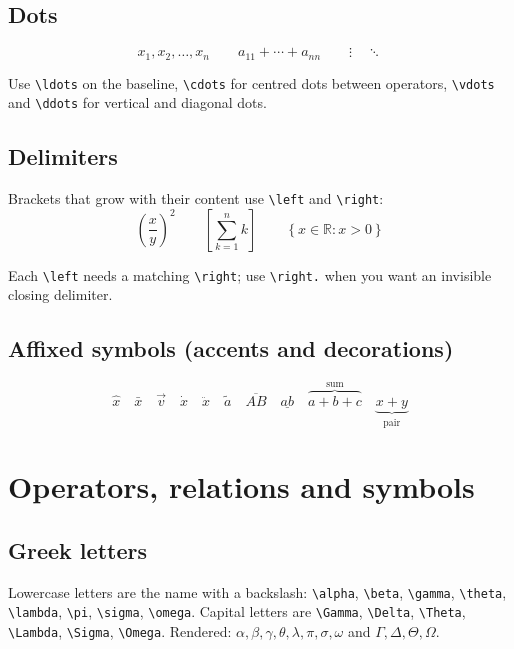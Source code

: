 \documentclass[11pt,a4paper]{article}
\begin{document}
\subsection{Dots}

\[
  x_1, x_2, \ldots, x_n \qquad
  a_{11} + \cdots + a_{nn} \qquad
  \vdots \quad \ddots
\]

Use \verb|\ldots| on the baseline, \verb|\cdots| for centred dots
between operators, \verb|\vdots| and \verb|\ddots| for vertical and
diagonal dots.

\subsection{Delimiters}

Brackets that grow with their content use \verb|\left| and \verb|\right|:
\[
  \left( \frac{x}{y} \right)^{2} \qquad
  \left[ \sum_{k=1}^{n} k \right] \qquad
  \left\{ x \in \mathbb{R} : x > 0 \right\}
\]

Each \verb|\left| needs a matching \verb|\right|; use \verb|\right.|
when you want an invisible closing delimiter.

\subsection{Affixed symbols (accents and decorations)}

\[
  \hat{x} \quad \bar{x} \quad \vec{v} \quad \dot{x} \quad \ddot{x}
  \quad \tilde{a} \quad \overline{AB} \quad \underline{ab}
  \quad \overbrace{a+b+c}^{\text{sum}} \quad \underbrace{x+y}_{\text{pair}}
\]

\section{Operators, relations and symbols}

\subsection{Greek letters}

Lowercase letters are the name with a backslash: \verb|\alpha|,
\verb|\beta|, \verb|\gamma|, \verb|\theta|, \verb|\lambda|,
\verb|\pi|, \verb|\sigma|, \verb|\omega|. Capital letters are
\verb|\Gamma|, \verb|\Delta|, \verb|\Theta|, \verb|\Lambda|,
\verb|\Sigma|, \verb|\Omega|. Rendered: $\alpha, \beta, \gamma, \theta,
\lambda, \pi, \sigma, \omega$ and $\Gamma, \Delta, \Theta, \Omega$.
\end{document}
